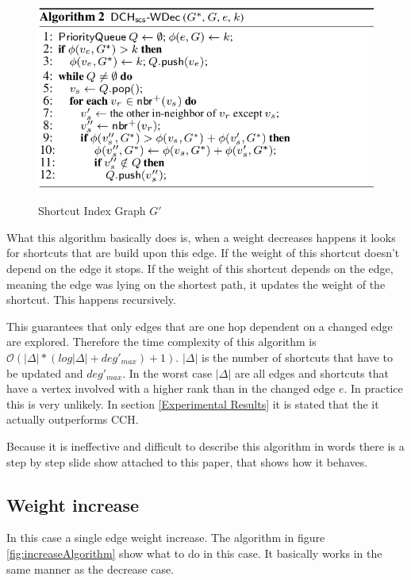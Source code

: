 \documentclass[twocolumn]{article}
\begin{document}
\begin{figure}[ht]
    \caption{Shortcut Index Graph $G'$}
    \centering
    \includegraphics[width=\linewidth]{decreaseAlgorithm}
    \label{fig:decreaseAlgorithm}
\end{figure}

What this algorithm basically does is, when a weight decreases happens it looks for shortcuts that are build upon this edge.
If the weight of this shortcut doesn't depend on the edge it stops. If the weight of this shortcut depends on the edge, 
meaning the edge was lying on the shortest path, it updates the weight of the shortcut. This happens recursively.

This guarantees that only edges that are one hop dependent on a changed edge are explored. Therefore the time complexity 
of this algorithm is $\mathcal{O}(\vert\Delta\vert  * (log \vert \Delta \vert + deg'_{max}) + 1)$.  $\vert\Delta\vert$ is the
number of shortcuts that have to be updated and $deg'_{max}$. 
In the worst case $\vert\Delta\vert$ are all edges and shortcuts that have a vertex involved with a higher rank than in the changed edge $e$.
In practice this is very unlikely. In section \ref{Experimental Results} it is stated that the it actually outperforms CCH.

Because it is ineffective and difficult to describe this algorithm in words there is a step by step slide show attached to this
paper, that shows how it behaves. 

\subsection{Weight increase}
In this case a single edge weight increase. The algorithm in figure \ref{fig:increaseAlgorithm} 
show what to do in this case. It basically works in the same manner as the decrease case.
\end{document}

